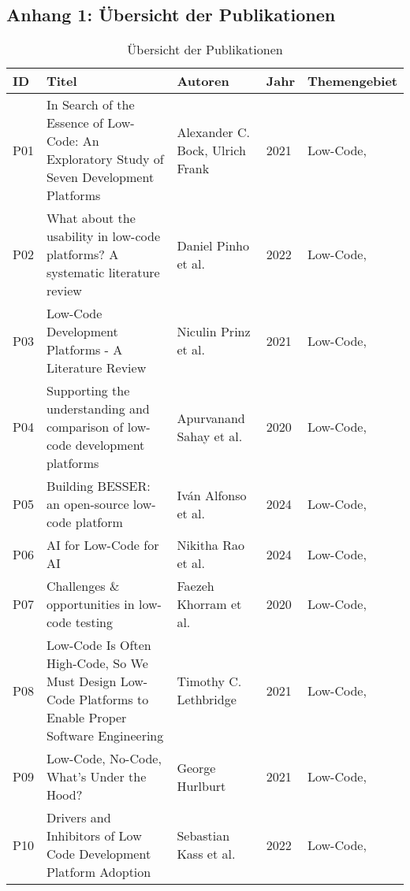 \subsection*{Anhang 1: Übersicht der Publikationen}

\setcounter{table}{0}
\renewcommand{\thetable}{A\arabic{table}}

\begin{longtable}{|m{0.8cm}|m{4.4cm}|m{3cm}|m{0.8cm}|m{4cm}|}
    \caption{Übersicht der Publikationen} 
    \label{tab:publikationen} \\
    \hline
    \textbf{ID} & \textbf{Titel} & \textbf{Autoren} & \textbf{Jahr} & \textbf{Themengebiet} \\
    \hline
    \endhead
    P01 & In Search of the Essence of Low-Code: An Exploratory Study of Seven Development Platforms & Alexander C. Bock, Ulrich Frank~\cite{Bock_2021_essence} & 2021 & Low-Code,  \\ \hline
    P02 & What about the usability in low-code platforms? A systematic literature review & Daniel Pinho et al.~\cite{Pinho_2022} & 2022 & Low-Code,  \\ \hline
    P03 & Low-Code Development Platforms - A Literature Review & Niculin Prinz et al.~\cite{Prinz_2021} & 2021 & Low-Code,  \\ \hline
    P04 & Supporting the understanding and comparison of low-code development platforms & Apurvanand Sahay et al.~\cite{Sahay_2020} & 2020 & Low-Code,  \\ \hline
    P05 & Building BESSER: an open-source low-code platform & Iván Alfonso et al.~\cite{alfonso2024building} & 2024 & Low-Code,  \\ \hline
    P06 & AI for Low-Code for AI & Nikitha Rao et al.~\cite{rao2024} & 2024 & Low-Code,  \\ \hline
    P07 & Challenges \& opportunities in low-code testing & Faezeh Khorram et al.~\cite{Khorram_2020} & 2020 & Low-Code,  \\ \hline
    P08 & Low-Code Is Often High-Code, So We Must Design Low-Code Platforms to Enable Proper Software Engineering & Timothy C. Lethbridge~\cite{lethbridge2021low} & 2021 & Low-Code,  \\ \hline
    P09 & Low-Code, No-Code, What's Under the Hood? & George Hurlburt~\cite{Hurlburt_2021} & 2021 & Low-Code,  \\ \hline
    P10 & Drivers and Inhibitors of Low Code Development Platform Adoption & Sebastian Kass et al.~\cite{Kass_2022} & 2022 & Low-Code,  \\ \hline

\end{longtable}
